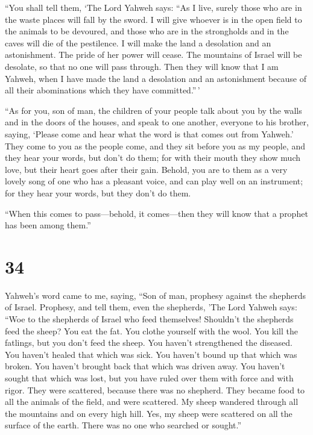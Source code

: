 ``You shall tell them, `The Lord Yahweh says: ``As I
live, surely those who are in the waste places will fall by the sword. I
will give whoever is in the open field to the animals to be devoured,
and those who are in the strongholds and in the caves will die of the
pestilence.  I will make the land a desolation and an
astonishment. The pride of her power will cease. The mountains of Israel
will be desolate, so that no one will pass through.  Then
they will know that I am Yahweh, when I have made the land a desolation
and an astonishment because of all their abominations which they have
committed.''\,'

 ``As for you, son of man, the children of your people
talk about you by the walls and in the doors of the houses, and speak to
one another, everyone to his brother, saying, `Please come and hear what
the word is that comes out from Yahweh.'  They come to
you as the people come, and they sit before you as my people, and they
hear your words, but don't do them; for with their mouth they show much
love, but their heart goes after their gain.  Behold, you
are to them as a very lovely song of one who has a pleasant voice, and
can play well on an instrument; for they hear your words, but they don't
do them.

 ``When this comes to pass---behold, it comes---then they
will know that a prophet has been among them.''

\hypertarget{section-32}{%
\section{34}\label{section-32}}

 Yahweh's word came to me, saying,  ``Son of
man, prophesy against the shepherds of Israel. Prophesy, and tell them,
even the shepherds, 'The Lord Yahweh says: ``Woe to the shepherds of
Israel who feed themselves! Shouldn't the shepherds feed the sheep?
 You eat the fat. You clothe yourself with the wool. You
kill the fatlings, but you don't feed the sheep.  You
haven't strengthened the diseased. You haven't healed that which was
sick. You haven't bound up that which was broken. You haven't brought
back that which was driven away. You haven't sought that which was lost,
but you have ruled over them with force and with rigor. 
They were scattered, because there was no shepherd. They became food to
all the animals of the field, and were scattered.  My
sheep wandered through all the mountains and on every high hill. Yes, my
sheep were scattered on all the surface of the earth. There was no one
who searched or sought.''

